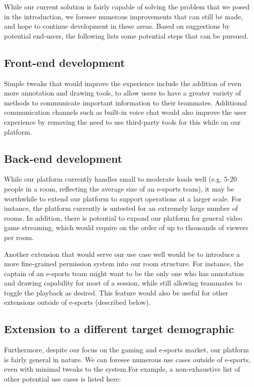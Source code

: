 \documentclass[conference]{IEEEtran}
\begin{document}
    While our current solution is fairly capable of solving the problem that we posed in the introduction, we foresee numerous improvements that can still be made, and hope to continue development in these areas. Based on suggestions by potential end-users, the following lists some potential steps that can be pursued.

\subsection{Front-end development}

    Simple tweaks that would improve the experience include the addition of even more annotation and drawing tools, to allow users to have a greater variety of methods to communicate important information to their teammates. Additional communication channels such as built-in voice chat would also improve the user experience by removing the need to use third-party tools for this while on our platform.

\subsection{Back-end development}

    While our platform currently handles small to moderate loads well (e.g. 5-20 people in a room, reflecting the average size of an e-sports team), it may be worthwhile to extend our platform to support operations at a larger scale. For instance, the platform currently is untested for an extremely large number of rooms. In addition, there is potential to expand our platform for general video game streaming, which would require on the order of up to thousands of viewers per room.

    Another extension that would serve our use case well would be to introduce a more fine-grained permission system into our room structure. For instance, the captain of an e-sports team might want to be the only one who has annotation and drawing capability for most of a session, while still allowing teammates to toggle the playback as desired. This feature would also be useful for other extensions outside of e-sports (described below).

\subsection{Extension to a different target demographic}

  Furthermore, despite our focus on the gaming and e-sports market, our platform is fairly general in nature. We can foresee numerous use cases outside of e-sports, even with minimal tweaks to the system.For example, a non-exhaustive list of other potential use cases is listed here:
\end{document}
